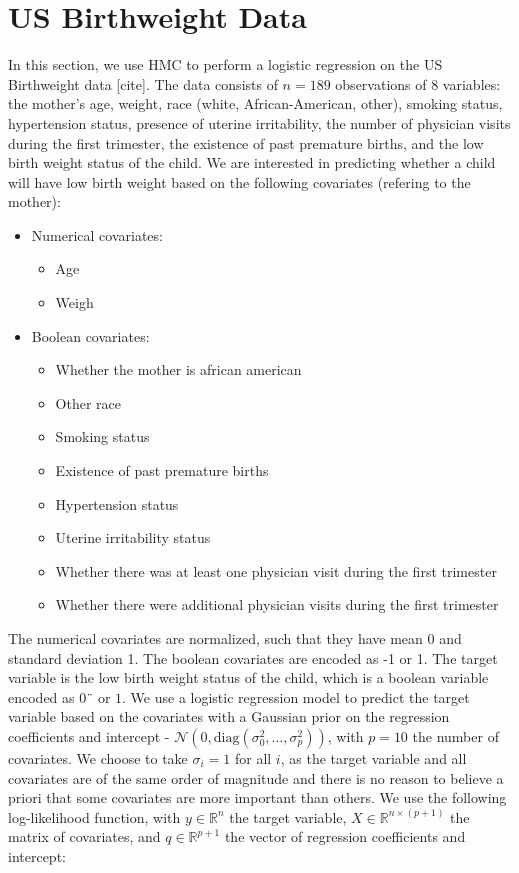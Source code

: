 \documentclass[a4paper, 12pt,oneside]{article}
\begin{document}
	\section{US Birthweight Data}
	In this section, we use HMC to perform a logistic regression on the US Birthweight data [cite]. The data consists of $n=189$ observations of 8 variables: the mother's age, weight, race (white, African-American, other), smoking status, hypertension status, presence of uterine irritability, the number of physician visits during the first trimester, the existence of past premature births, and the low birth weight status of the child. We are interested in predicting whether a child will have low birth weight based on the following covariates (refering to the mother):
	\begin{itemize}
		\item Numerical covariates:
		\begin{itemize}
			\item Age
			\item Weigh
		\end{itemize}
		\item Boolean covariates:
		\begin{itemize}
			\item Whether the mother is african american
			\item Other race
			\item Smoking status
			\item Existence of past premature births
			\item Hypertension status
			\item Uterine irritability status
			\item Whether there was at least one physician visit during the first trimester
			\item Whether there were additional physician visits during the first trimester
		\end{itemize}
	\end{itemize}
	The numerical covariates are normalized, such that they have mean 0 and standard deviation 1. The boolean covariates are encoded as -1 or 1. The target variable is the low birth weight status of the child, which is a boolean variable encoded as $0¨$ or $1$. We use a logistic regression model to predict the target variable based on the covariates with a Gaussian prior on the regression coefficients and intercept - $\mathcal{N}(0,\mathrm{diag}(\sigma^2_0, \ldots, \sigma^2_p))$, with $p=10$ the number of covariates. We choose to take $\sigma_i = 1$ for all $i$, as the target variable and all covariates are of the same order of magnitude and there is no reason to believe a priori that some covariates are more important than others. We use the following log-likelihood function, with $y\in \mathbb{R}^{n}$ the target variable, $X\in \mathbb{R}^{n\times (p+1)}$ the matrix of covariates, and $q\in \mathbb{R}^{p+1}$ the vector of regression coefficients and intercept:
\end{document}
